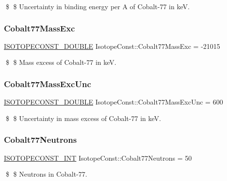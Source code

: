 \$ \$ Uncertainty in binding energy per A of Cobalt-\/77 in keV. \mbox{\label{group___isotope_const-_cobalt-_co77_ga02a90ea1dac9d979d8f054ab9087f450}} 
\subsubsection{\texorpdfstring{Cobalt77\+Mass\+Exc}{Cobalt77MassExc}}
{\footnotesize\ttfamily \mbox{\hyperlink{group___isotope_const-_macros_ga8f45a7272ce02c0b4c65c44636ed719a}{I\+S\+O\+T\+O\+P\+E\+C\+O\+N\+S\+T\+\_\+\+D\+O\+U\+B\+LE}} Isotope\+Const\+::\+Cobalt77\+Mass\+Exc = -\/21015}

\$ \$ Mass excess of Cobalt-\/77 in keV. \mbox{\label{group___isotope_const-_cobalt-_co77_gaf3ab69df851e8617e3950abb227a65b9}} 
\subsubsection{\texorpdfstring{Cobalt77\+Mass\+Exc\+Unc}{Cobalt77MassExcUnc}}
{\footnotesize\ttfamily \mbox{\hyperlink{group___isotope_const-_macros_ga8f45a7272ce02c0b4c65c44636ed719a}{I\+S\+O\+T\+O\+P\+E\+C\+O\+N\+S\+T\+\_\+\+D\+O\+U\+B\+LE}} Isotope\+Const\+::\+Cobalt77\+Mass\+Exc\+Unc = 600}

\$ \$ Uncertainty in mass excess of Cobalt-\/77 in keV. \mbox{\label{group___isotope_const-_cobalt-_co77_ga92816c50eddaeee60163e0d61d84ecd2}} 
\subsubsection{\texorpdfstring{Cobalt77\+Neutrons}{Cobalt77Neutrons}}
{\footnotesize\ttfamily \mbox{\hyperlink{group___isotope_const-_macros_ga5f18360b3e99483a35c32d789e62621c}{I\+S\+O\+T\+O\+P\+E\+C\+O\+N\+S\+T\+\_\+\+I\+NT}} Isotope\+Const\+::\+Cobalt77\+Neutrons = 50}

\$ \$ Neutrons in Cobalt-\/77. \mbox{\label{group___isotope_const-_cobalt-_co77_ga575b894e879679d85e6225584c490ee1}} 
